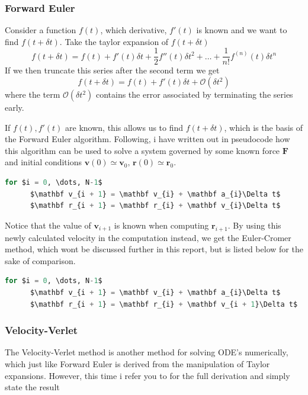 \documentclass[10pt,showpacs,preprintnumbers,amsmath,amssymb,nofootinbib,aps,prl,twocolumn,groupedaddress,superscriptaddress,showkeys]{revtex4-1}
\begin{document}
  \subsubsection{Forward Euler}
    Consider a function $f(t)$, which derivative, $f'(t)$ is known and we want to find $f(t + \delta t)$. 
    Take the taylor expansion of $f(t + \delta t)$
    \begin{equation}
      f(t + \delta t) = f(t) + f'(t)\delta t + \frac{1}{2}f''(t)\delta t^2 + \dots + \frac{1}{n!}f^{(n)}(t)\delta t^n
    \end{equation}
    If we then truncate this series after the second term we get
    \begin{equation}
      f(t + \delta t) = f(t) + f'(t)\delta t + \mathcal O(\delta t^2)
    \end{equation}
    where the term $\mathcal O(\delta t^2)$ contains the error associated by terminating the series early.

    If $f(t), f'(t)$ are known, this allows us to find $f(t + \delta t)$, which is the basis of the Forward Euler algorithm. Following, i have written out in pseudocode how this algorithm can be used to solve a system governed by some known force $\mathbf F$ and initial conditions $\mathbf v(0) \simeq \mathbf v_0,\, \mathbf r(0) \simeq \mathbf r_0$.

    \begin{lstlisting}[mathescape=true, language=python, title=Forward Euler Algorithm (4N FLOPS)]
  for $i = 0, \dots, N-1$
      $\mathbf v_{i + 1} = \mathbf v_{i} + \mathbf a_{i}\Delta t$
      $\mathbf r_{i + 1} = \mathbf r_{i} + \mathbf v_{i}\Delta t$
  \end{lstlisting}

  Notice that the value of $\mathbf v_{i+1}$ is known when computing $\mathbf r_{i+1}$. By using this newly calculated velocity in the computation instead, we get the Euler-Cromer method, which wont be discussed further in this report, but is listed below for the sake of comparison.

  \begin{lstlisting}[mathescape=true, language=python, title=Euler-Cromer Algorithm (4N FLOPS)]
  for $i = 0, \dots, N-1$
      $\mathbf v_{i + 1} = \mathbf v_{i} + \mathbf a_{i}\Delta t$
      $\mathbf r_{i + 1} = \mathbf r_{i} + \mathbf v_{i + 1}\Delta t$
  \end{lstlisting}

  \subsubsection{Velocity-Verlet}
    The Velocity-Verlet method is another method for solving ODE's numerically, which just like Forward Euler is derived from the manipulation of Taylor expansions. However, this time i refer you to \cite{ode_lecture} for the full derivation and simply state the result
\end{document}
